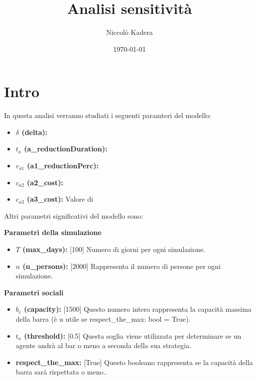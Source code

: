 \documentclass{article}
\title{Analisi sensitività}
\author{Niccolò Kadera}
\date{\today}
\begin{document}
{\selectfont
\maketitle

\section{Intro}
In questa analisi verranno studiati i seguenti paramteri del modello:

\begin{itemize}
    \item \textbf{$\delta$ (delta):} 
    \item \textbf{$t_{a} $ (a\_reductionDuration):} 
    \item \textbf{$r_{a1}$ (a1\_reductionPerc):} 
    \item \textbf{$c_{a2}$ (a2\_cost):} 
    \item \textbf{$c_{a3}$ (a3\_cost):} Valore di \newline
\end{itemize}

Altri parametri significativi del modello sono: \newline

    
    \textbf{Parametri della simulazione}
    \begin{itemize}
        \item \textbf{$T$ (max\_days):} [100] Numero di giorni per ogni simulazione.
        \item \textbf{$n$ (n\_persons):} [2000] Rappresenta il numero di persone per ogni simulazione.\newline
    \end{itemize}

    \textbf{Parametri sociali}
    \begin{itemize}
        \item \textbf{$b_{c}$ (capacity):} [1500] Questo numero intero rappresenta la capacità massima della barra (è u utile se respect\_the\_max: bool = True).
        \item \textbf{$t_a$ (threshold): } [0.5] Questa soglia viene utilizzata per determinare se un agente andrà al bar o meno a seconda della sua strategia.
        \item \textbf{respect\_the\_max: } [True] Questo booleano rappresenta se la capacità della barra sarà rispettata o meno..\newline
    \end{itemize}

}
\end{document}
